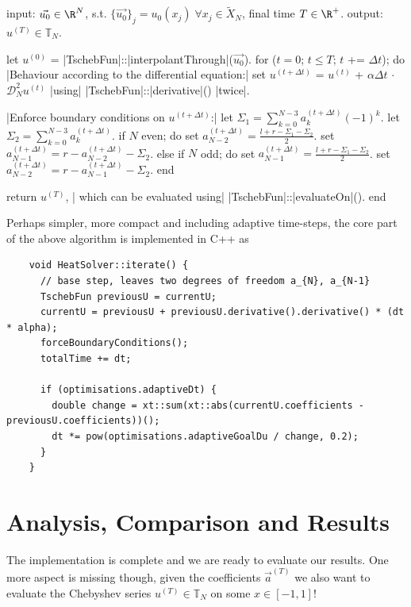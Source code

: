 \documentclass[12pt, a4paper]{article}
\newcommand{\chebyshev}{Chebyshev\xspace}
\begin{document}
  \begin{algorithm}[language=pseudo,caption={\centering Our final solving algorithm}]
input: $\vec{u_0} \in \R^N$, s.t. $\{\vec{u_0}\}_j = u_0(x_j) \; \forall x_j \in \tilde{X}_N$, final time $T \in \R^+$.
output: $u^{(T)} \in \mathbb{T}_N$.

let $u^{(0)}$ = |\color{themecolor3}TschebFun|::|\color{themecolor2}interpolantThrough|($\vec{u_0}$).
for ($t = 0$; $t \le T$; $t$ += $\Delta t$); do
  |\rm\color{gray}Behaviour according to the differential equation:|
  set $u^{(t+\Delta t)}$ = $u^{(t)}$ + $\alpha \Delta t$ $\cdot$ $\mathcal{D}_N^2 u^{(t)}$ |\rm\color{gray}using| |\color{themecolor3}TschebFun|::|\color{themecolor2}derivative|() |\rm\color{gray}twice|.

  |\rm\color{gray}Enforce boundary conditions on $u^{(t+\Delta t)}$:|
  let $\Sigma_1 = \sum_{k=0}^{N-3} a_k^{(t+\Delta t)} (-1)^k$.
  let $\Sigma_2 = \sum_{k=0}^{N-3} a_k^{(t+\Delta t)}$.
  if $N$ even; do
    set $a_{N-2}^{(t+\Delta t)} = \frac{l+r-\Sigma_1-\Sigma_2}{2}$.
    set $a_{N-1}^{(t+\Delta t)} = r - a_{N-2}^{(t+\Delta t)} - \Sigma_2$.
  else if $N$ odd; do
    set $a_{N-1}^{(t+\Delta t)} = \frac{l+r-\Sigma_1-\Sigma_2}{2}$.
    set $a_{N-2}^{(t+\Delta t)} = r - a_{N-1}^{(t+\Delta t)} - \Sigma_2$.
  end

  return $u^{(T)}$, |\rm\color{gray} which can be evaluated using| |\color{themecolor3}TschebFun|::|\color{themecolor2}evaluateOn|().
end
  \end{algorithm}

  Perhaps simpler, more compact and including adaptive time-steps, the core part of the above algorithm is implemented in C++ as
  \begin{verbatim}
    void HeatSolver::iterate() {
      // base step, leaves two degrees of freedom a_{N}, a_{N-1}
      TschebFun previousU = currentU;
      currentU = previousU + previousU.derivative().derivative() * (dt * alpha);
      forceBoundaryConditions();
      totalTime += dt;

      if (optimisations.adaptiveDt) {
        double change = xt::sum(xt::abs(currentU.coefficients - previousU.coefficients))();
        dt *= pow(optimisations.adaptiveGoalDu / change, 0.2);
      }
    }
  \end{verbatim}

  \section{Analysis, Comparison and Results}
  The implementation is complete and we are ready to evaluate our results.
  One more aspect is missing though, given the coefficients $\vec{a}^{(T)}$ we also want to evaluate the \chebyshev series $u^{(T)} \in \mathbb{T}_N$ on some $x \in [-1, 1]$!
\end{document}
